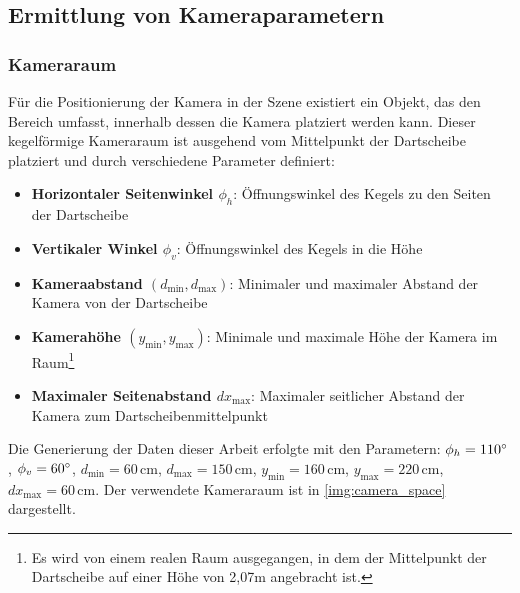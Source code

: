 \subsection{Ermittlung von Kameraparametern}  %
\label{sec:ermittlung_kameraparamater}

\subsubsection{Kameraraum}

Für die Positionierung der Kamera in der Szene existiert ein Objekt, das den Bereich umfasst, innerhalb dessen die Kamera platziert werden kann. Dieser kegelförmige Kameraraum ist ausgehend vom Mittelpunkt der Dartscheibe platziert und durch verschiedene Parameter definiert:

\begin{itemize}
    \item \textbf{Horizontaler Seitenwinkel $\phi_h$}: Öffnungswinkel des Kegels zu den Seiten der Dartscheibe
    \item \textbf{Vertikaler Winkel $\phi_v$}: Öffnungswinkel des Kegels in die Höhe
    \item \textbf{Kameraabstand $\left(d_\text{min}, d_\text{max}\right)$}: Minimaler und maximaler Abstand der Kamera von der Dartscheibe
    \item \textbf{Kamerahöhe $\left(y_\text{min}, y_\text{max}\right)$}: Minimale und maximale Höhe der Kamera im Raum\footnote{Es wird von einem realen Raum ausgegangen, in dem der Mittelpunkt der Dartscheibe auf einer Höhe von 2,07m angebracht ist.}
    \item \textbf{Maximaler Seitenabstand $dx_\text{max}$}: Maximaler seitlicher Abstand der Kamera zum Dartscheibenmittelpunkt
\end{itemize}


Die Generierung der Daten dieser Arbeit erfolgte mit den Parametern: $\phi_h = 110^{\circ}$, $\phi_v = 60^{\circ}$, $d_\text{min} = 60\,\text{cm}$, $d_\text{max} = 150\,\text{cm}$, $y_\text{min} = 160\,\text{cm}$, $y_\text{max} = 220\,\text{cm}$, $dx_\text{max} = 60\,\text{cm}$. Der verwendete Kameraraum ist in \autoref{img:camera_space} dargestellt.

